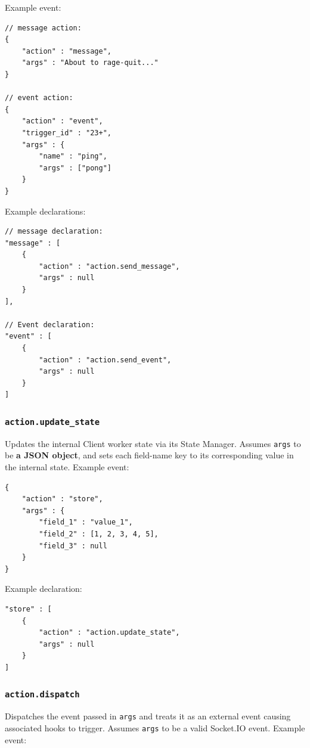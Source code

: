 \documentclass[a4paper]{article}
\begin{document}
\noindent
Example event:

\begin{verbatim}
// message action:
{
    "action" : "message",
    "args" : "About to rage-quit..."
}

// event action:
{
    "action" : "event",
    "trigger_id" : "23+",
    "args" : {
        "name" : "ping",
        "args" : ["pong"]
    }
}
\end{verbatim}




\noindent
Example declarations:

\begin{verbatim}
// message declaration:
"message" : [
    {
        "action" : "action.send_message",
        "args" : null
    }
],

// Event declaration:
"event" : [
    {
        "action" : "action.send_event",
        "args" : null
    }
]
\end{verbatim}
\subsubsection{\texttt{action.update\_state}}
\label{sec-9-3-4}

Updates the internal Client worker state via its State Manager. Assumes \texttt{args} to be \textbf{a JSON object}, and sets each field-name key to its corresponding value in the internal state. Example event:

\begin{verbatim}
{
    "action" : "store",
    "args" : {
        "field_1" : "value_1",
        "field_2" : [1, 2, 3, 4, 5],
        "field_3" : null
    }
}
\end{verbatim}




\noindent
Example declaration:

\begin{verbatim}
"store" : [
    {
        "action" : "action.update_state",
        "args" : null
    }
]
\end{verbatim}
\subsubsection{\texttt{action.dispatch}}
\label{sec-9-3-5}

Dispatches the event passed in \texttt{args} and treats it as an external event causing associated hooks to trigger. Assumes \texttt{args} to be a valid Socket.IO event. Example event:
\end{document}
